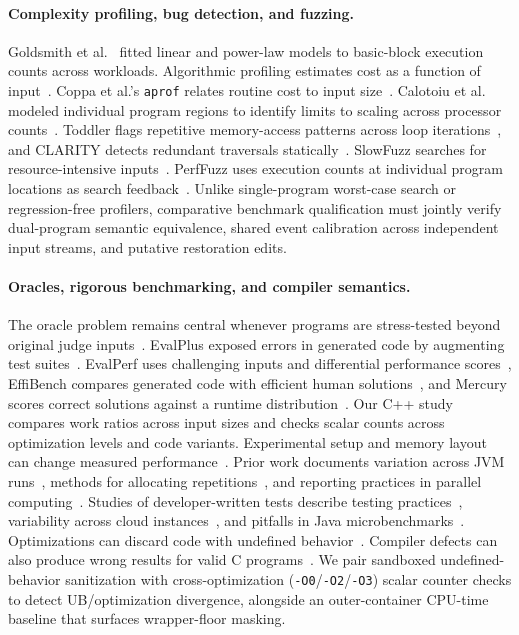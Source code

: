 \documentclass[11pt]{article}
\begin{document}
\paragraph{Complexity profiling, bug detection, and fuzzing.}
Goldsmith et al.~\cite{goldsmith2007measuring} fitted linear and power-law models to basic-block execution counts across workloads.
Algorithmic profiling estimates cost as a function of input~\cite{zaparanuks2012algorithmic}. Coppa et al.'s \texttt{aprof} relates routine cost to input size~\cite{coppa2012input}. Calotoiu et al. modeled individual program regions to identify limits to scaling across processor counts~\cite{calotoiu2013using}.
Toddler flags repetitive memory-access patterns across loop iterations~\cite{nistor2013toddler}, and CLARITY detects redundant traversals statically~\cite{olivo2015static}. SlowFuzz searches for resource-intensive inputs~\cite{petsios2017slowfuzz}. PerfFuzz uses execution counts at individual program locations as search feedback~\cite{lemieux2018perffuzz}.
Unlike single-program worst-case search or regression-free profilers, comparative benchmark qualification must jointly verify dual-program semantic equivalence, shared event calibration across independent input streams, and putative restoration edits.

\paragraph{Oracles, rigorous benchmarking, and compiler semantics.}
The oracle problem remains central whenever programs are stress-tested beyond original judge inputs~\cite{barr2015oracle}.
EvalPlus exposed errors in generated code by augmenting test suites~\cite{liu2023is}. EvalPerf uses challenging inputs and differential performance scores~\cite{liu2024evaluating}, EffiBench compares generated code with efficient human solutions~\cite{huang2024effibench}, and Mercury scores correct solutions against a runtime distribution~\cite{du2024mercury}.
Our C++ study compares work ratios across input sizes and checks scalar counts across optimization levels and code variants.
Experimental setup and memory layout can change measured performance~\cite{mytkowicz2009producing,curtsinger2013stabilizer}. Prior work documents variation across JVM runs~\cite{georges2007statistically}, methods for allocating repetitions~\cite{kalibera2013rigorous}, and reporting practices in parallel computing~\cite{hoefler2015scientific}. Studies of developer-written tests describe testing practices~\cite{leitner2017exploratory}, variability across cloud instances~\cite{laaber2019software}, and pitfalls in Java microbenchmarks~\cite{costa2021whats}. Optimizations can discard code with undefined behavior~\cite{wang2013towards}. Compiler defects can also produce wrong results for valid C programs~\cite{yang2011finding}.
We pair sandboxed undefined-behavior sanitization with cross-optimization (\texttt{-O0}/\texttt{-O2}/\texttt{-O3}) scalar counter checks to detect UB/optimization divergence, alongside an outer-container CPU-time baseline that surfaces wrapper-floor masking.
\end{document}
